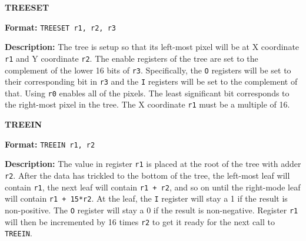 \noindent\textsf{\textbf{\Large TREESET}}\par
{}\par\begin{indented}{\bf Format:}
{\tt TREESET r1, r2, r3}\par\vspace{3ex}
\end{indented}\vspace{4ex}
\begin{indented}{\bf Description:}
The tree is setup so that its left-most pixel will be at X coordinate
{\tt r1} and Y coordinate {\tt r2}.  The enable registers of the tree
are set to the complement of the lower 16 bits of {\tt r3}. 
Specifically, the {\tt O} registers will be set to their corresponding
bit in {\tt r3} and the {\tt I} registers will be set to the
complement of that.  Using {\tt r0} enables all of the pixels.  The
least significant bit corresponds to the right-most pixel in the tree.
The X coordinate {\tt r1} must be a multiple of 16.
\end{indented}
\vspace{2em}

\newpage
\noindent\textsf{\textbf{\Large TREEIN}}\par
{}\par\begin{indented}{\bf Format:}
{\tt TREEIN r1, r2}\par\vspace{3ex}
\end{indented}\vspace{4ex}
\begin{indented}{\bf Description:}
The value in register {\tt r1} is placed at the root of the tree with
adder {\tt r2}.  After the data has trickled to the bottom of the
tree, the left-most leaf will contain {\tt r1}, the next leaf will
contain {\tt r1 + r2}, and so on until the right-mode leaf will
contain {\tt r1 + 15*r2}.  At the leaf, the {\tt I} register will stay
a 1 if the result is non-positive.  The {\tt O} register will stay a 0
if the result is non-negative.  Register {\tt r1} will then be
incremented by 16 times {\tt r2} to get it ready for the next call to
{\tt TREEIN}.
\end{indented}
\vspace{2em}

